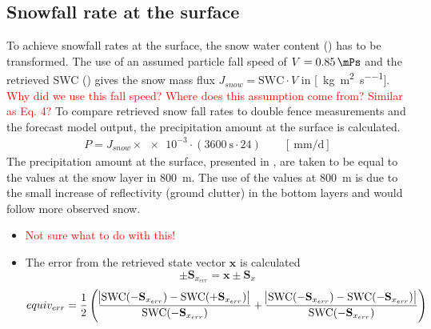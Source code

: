 \subsection{Snowfall rate at the surface}
%
To achieve snowfall rates at the surface, the snow water content () has to be transformed. The use of an assumed particle fall speed of $V = \SI{0.85}{\mPs}$ and the retrieved SWC () gives the snow mass flux $J_{snow} = \text{SWC} \cdot V$ in [\SI{}{\kilogram\per\square\metre\per\second}]. \textcolor{red}{Why did we use this fall speed? Where does this assumption come from? Similar as \cite{cooper_variational_2017} Eq. 4?} 
To compare retrieved snow fall rates to double fence measurements and the forecast model output, the precipitation amount at the surface is calculated. 
\begin{align}
P = J_{snow} \times \num{e-3} \cdot \left(\SI{3600}{\second} \cdot24 \right) \qquad [\SI{}{\mm\per\day}]
\end{align}
The precipitation amount at the surface, presented in , are taken to be equal to the values at the snow layer in \SI{800}{\metre}. The use of the values at \SI{800}{\metre} is due to the small increase of reflectivity (ground clutter) in the bottom layers and would follow more observed snow. 
%
\begin{itemize}
	\item \textcolor{red}{Not sure what to do with this!}
	\item The error from the retrieved state vector $\mathbf{x}$ is calculated
	$$\pm \mathbf{S}_{x_{err}} = \mathbf{x} \pm \mathbf{S}_x$$ 
	$$equiv_{err} = \frac{1}{2} \left( \frac{\abs{\text{SWC}(- \mathbf{S}_{x_{err}} ) - \text{SWC} (+ \mathbf{S}_{x_{err}}) }}{ \text{SWC}(- \mathbf{S}_{x_{err}})} + \frac{\abs{ \text{SWC}(- \mathbf{S}_{x_{err}}) - \text{SWC}(- \mathbf{S}_{x_{err}}) }}{ \text{SWC}(- \mathbf{S}_{x_{err}})} \right)$$
\end{itemize}






